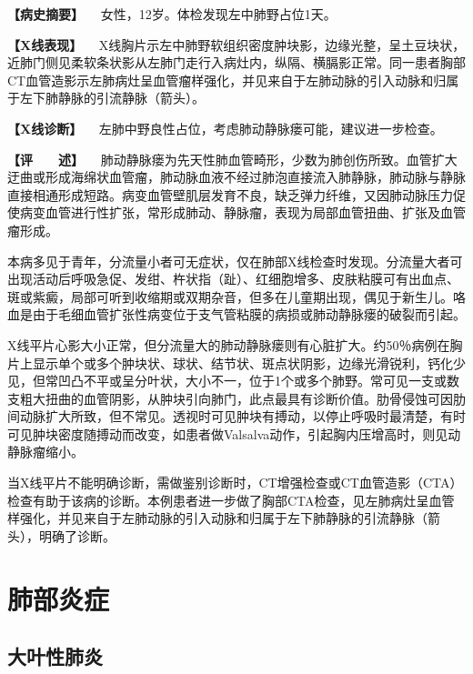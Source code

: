 \textbf{【病史摘要】} 　女性，12岁。体检发现左中肺野占位1天。

\textbf{【X线表现】}
　X线胸片示左中肺野软组织密度肿块影，边缘光整，呈土豆块状，近肺门侧见柔软条状影从左肺门走行入病灶内，纵隔、横膈影正常。同一患者胸部CT血管造影示左肺病灶呈血管瘤样强化，并见来自于左肺动脉的引入动脉和归属于左下肺静脉的引流静脉（箭头）。

\textbf{【X线诊断】}
　左肺中野良性占位，考虑肺动静脉瘘可能，建议进一步检查。

\textbf{【评　　述】}
　肺动静脉瘘为先天性肺血管畸形，少数为肺创伤所致。血管扩大迂曲或形成海绵状血管瘤，肺动脉血液不经过肺泡直接流入肺静脉，肺动脉与静脉直接相通形成短路。病变血管壁肌层发育不良，缺乏弹力纤维，又因肺动脉压力促使病变血管进行性扩张，常形成肺动、静脉瘤，表现为局部血管扭曲、扩张及血管瘤形成。

本病多见于青年，分流量小者可无症状，仅在肺部X线检查时发现。分流量大者可出现活动后呼吸急促、发绀、杵状指（趾）、红细胞增多、皮肤粘膜可有出血点、斑或紫癜，局部可听到收缩期或双期杂音，但多在儿童期出现，偶见于新生儿。咯血是由于毛细血管扩张性病变位于支气管粘膜的病损或肺动静脉瘘的破裂而引起。

X线平片心影大小正常，但分流量大的肺动静脉瘘则有心脏扩大。约50％病例在胸片上显示单个或多个肿块状、球状、结节状、斑点状阴影，边缘光滑锐利，钙化少见，但常凹凸不平或呈分叶状，大小不一，位于1个或多个肺野。常可见一支或数支粗大扭曲的血管阴影，从肿块引向肺门，此点最具有诊断价值。肋骨侵蚀可因肋间动脉扩大所致，但不常见。透视时可见肿块有搏动，以停止呼吸时最清楚，有时可见肿块密度随搏动而改变，如患者做Valsalva动作，引起胸内压增高时，则见动静脉瘤缩小。

当X线平片不能明确诊断，需做鉴别诊断时，CT增强检查或CT血管造影（CTA）检查有助于该病的诊断。本例患者进一步做了胸部CTA检查，见左肺病灶呈血管样强化，并见来自于左肺动脉的引入动脉和归属于左下肺静脉的引流静脉（箭头），明确了诊断。

\section{肺部炎症}

\subsection{大叶性肺炎}

